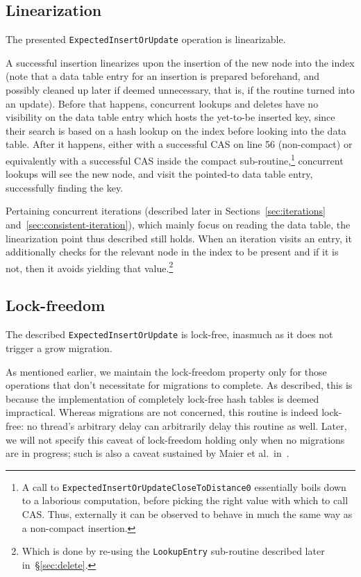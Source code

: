 

\subsection{Linearization}\label{subsec:insert-linearization}

The presented \texttt{ExpectedInsertOrUpdate} operation is linearizable.

A successful insertion linearizes upon the insertion of the new node into the index (note that a data table entry for an insertion is prepared beforehand, and possibly cleaned up later if deemed unnecessary, that is, if the routine turned into an update).
Before that happens, concurrent lookups and deletes have no visibility on the data table entry which hosts the yet-to-be inserted key, since their search is based on a hash lookup on the index before looking into the data table.
After it happens, either with a successful CAS on line 56 (non-compact) or equivalently with a successful CAS inside the compact sub-routine,\footnote{%
	A call to \texttt{ExpectedInsertOrUpdateCloseToDistance0} essentially boils down to a laborious computation, before picking the right value with which to call CAS.
	Thus, externally it can be observed to behave in much the same way as a non-compact insertion.
} concurrent lookups will see the new node, and visit the pointed-to data table entry, successfully finding the key.

Pertaining concurrent iterations (described later in Sections~\ref{sec:iterations} and~\ref{sec:consistent-iteration}), which mainly focus on reading the data table, the linearization point thus described still holds.
When an iteration visits an entry, it additionally checks for the relevant node in the index to be present and if it is not, then it avoids yielding that value.\footnote{%
	Which is done by re-using the \texttt{LookupEntry} sub-routine described later in~\S\ref{sec:delete}.
}


\subsection{Lock-freedom}\label{subsec:insert-lock-freedom}

The described \texttt{ExpectedInsertOrUpdate} is lock-free, inasmuch as it does not trigger a grow migration.

As mentioned earlier, we maintain the lock-freedom property only for those operations that don't necessitate for migrations to complete.
As described, this is because the implementation of completely lock-free hash tables is deemed impractical.
Whereas migrations are not concerned, this routine is indeed lock-free: no thread's arbitrary delay can arbitrarily delay this routine as well.
Later, we will not specify this caveat of lock-freedom holding only when no migrations are in progress; such is also a caveat sustained by Maier et al.\ in~\cite{maier}.

